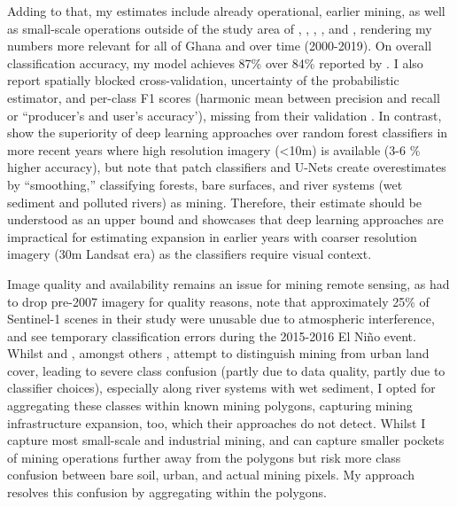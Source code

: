 \documentclass[]{interact}
\begin{document}
Adding to that, my estimates include already operational, earlier mining, as well as small-scale operations outside of the study area of \citet{barenblitt2021large}, \citet{snapir2017Mapping}, \citet{forkuor2020Mapping}, \citet{obodai2019Land}, and \citet{gallwey2020Sentinel2}, rendering my numbers more relevant for all of Ghana and over time (2000-2019). On overall classification accuracy, my model achieves 87\% over 84\% reported by \citet{barenblitt2021large}. I also report spatially blocked cross-validation, uncertainty of the probabilistic estimator, and per-class F1 scores (harmonic mean between precision and recall or ``producer's and user's accuracy'), missing from their validation \citep[p.5]{barenblitt2021large}. In contrast, \citet[pp.10,12]{gallwey2020Sentinel2} show the superiority of deep learning approaches over random forest classifiers in more recent years where high resolution imagery (<10m) is available (3-6 \% higher accuracy), but note that patch classifiers and U-Nets create overestimates by ``smoothing,'' classifying forests, bare surfaces, and river systems (wet sediment and polluted rivers) as mining. Therefore, their estimate should be understood as an upper bound and showcases that deep learning approaches are impractical for estimating expansion in earlier years with coarser resolution imagery (30m Landsat era) as the classifiers require visual context. 

Image quality and availability remains an issue for mining remote sensing, as \citet{barenblitt2021large} had to drop pre-2007 imagery for quality reasons, \citet{forkuor2020Mapping} note that approximately 25\% of Sentinel-1 scenes in their study were unusable due to atmospheric interference, and \citet{gallwey2020Sentinel2} see temporary classification errors during the 2015-2016 El Niño event. Whilst \citet{barenblitt2021large} and \citet{gallwey2020Sentinel2}, amongst others \citep{forkuor2020Mapping,snapir2017Mapping,obodai2019Land}, attempt to distinguish mining from urban land cover, leading to severe class confusion (partly due to data quality, partly due to classifier choices), especially along river systems with wet sediment, I opted for aggregating these classes within known mining polygons, capturing mining infrastructure expansion, too, which their approaches do not detect. Whilst I capture most small-scale and industrial mining, \citet{barenblitt2021large} and \citet{gallwey2020Sentinel2} can capture smaller pockets of mining operations further away from the \citet{maus2022update} polygons but risk more class confusion between bare soil, urban, and actual mining pixels. My approach resolves this confusion by aggregating within the polygons.
\end{document}

